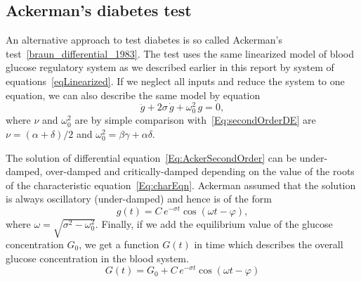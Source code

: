 \documentclass{article}
\begin{document}
\subsection{Ackerman's diabetes test}
An alternative approach to test diabetes is so called Ackerman's test~\ref{braun_differential_1983}. The test uses the same linearized model of blood glucose regulatory system as we described earlier in this report by system of equations~\eqref{eqLinearized}. If we neglect all inputs and reduce the system to one equation, we can also describe the same model by equation
\begin{equation}
	\label{Eq:AckerSecondOrder}
	\ddot g+2\sigma\,\dot g+\omega_0^2\,g=0,
\end{equation}
where $\nu$ and $\omega_0^2$ are by simple comparison with~\eqref{Eq:secondOrderDE} are $\nu = (\alpha+\delta)/2$ and $\omega_0^2 = \beta\gamma+\alpha\delta$.

The solution of differential equation~\eqref{Eq:AckerSecondOrder} can be under-damped, over-damped and critically-damped depending on the value of the roots of the characteristic equation~\eqref{Eq:charEqn}. Ackerman assumed that the solution is always oscillatory (under-damped) and hence is of the form
\begin{equation}
	g(t) = C\,e^{-\sigma t}\cos ( \omega t  - \varphi),
\end{equation}
where $\omega = \sqrt{\sigma^2-\omega_0^2}$. Finally, if we add the equilibrium value of the glucose concentration $G_0$, we get a function $G(t)$ in time which describes the overall glucose concentration in the blood system.
\begin{equation}
	G(t) = G_0 + C\,e^{-\sigma t}\cos ( \omega t  - \varphi)
\end{equation}



\end{document}
